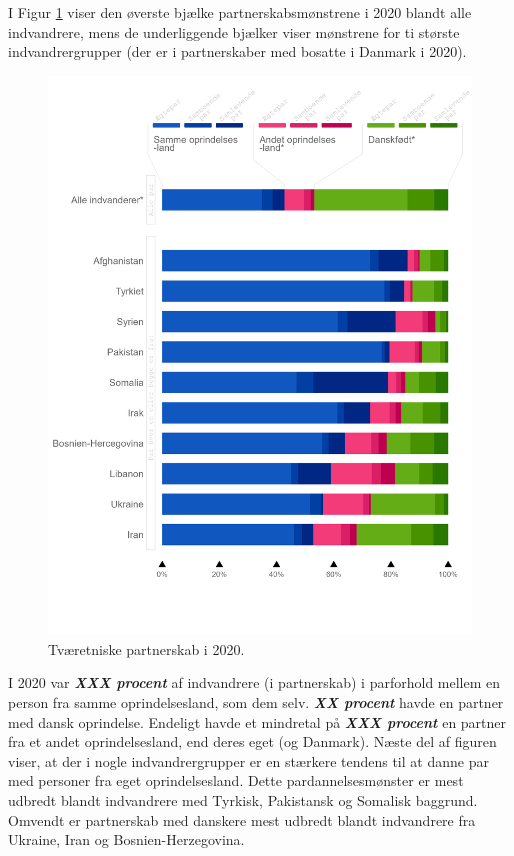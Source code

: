 \documentclass[
]{book}
\begin{document}
I Figur \ref{fig:fig-2-2} viser den øverste bjælke partnerskabsmønstrene i 2020 blandt alle indvandrere, mens de underliggende bjælker viser mønstrene for ti største indvandrergrupper (der er i partnerskaber med bosatte i Danmark i 2020).

\begin{figure}
\includegraphics[width=1\linewidth]{images/figur_intergruppepartnerskaber_2020} \caption{Tværetniske partnerskab i 2020.}\label{fig:fig-2-2}
\end{figure}

I 2020 var \textbf{\emph{XXX procent}} af indvandrere (i partnerskab) i parforhold mellem en person fra samme oprindelsesland, som dem selv. \textbf{\emph{XX procent}} havde en partner med dansk oprindelse. Endeligt havde et mindretal på \textbf{\emph{XXX procent}} en partner fra et andet oprindelsesland, end deres eget (og Danmark). Næste del af figuren viser, at der i nogle indvandrergrupper er en stærkere tendens til at danne par med personer fra eget oprindelsesland. Dette pardannelsesmønster er mest udbredt blandt indvandrere med Tyrkisk, Pakistansk og Somalisk baggrund. Omvendt er partnerskab med danskere mest udbredt blandt indvandrere fra Ukraine, Iran og Bosnien-Herzegovina.
\end{document}
